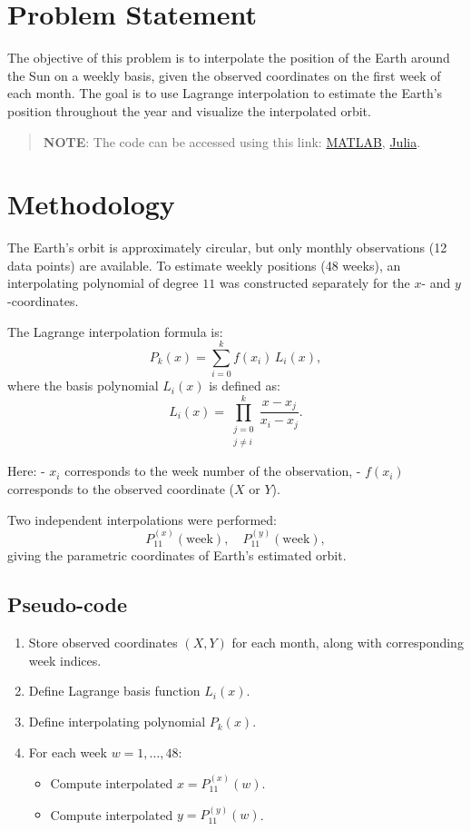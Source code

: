 \section*{Problem Statement}
The objective of this problem is to interpolate the position of the Earth around the Sun on a weekly basis, given the observed coordinates on the first week of each month. The goal is to use Lagrange interpolation to estimate the Earth’s position throughout the year and visualize the interpolated orbit.

\begin{quote}
  \textbf{NOTE}: The code can be accessed using this link: \href{https://raw.githubusercontent.com/HavokSahil/computational-techniques-assignments/refs/heads/main/assignment3/a2.m}{MATLAB}, \href{https://raw.githubusercontent.com/HavokSahil/computational-techniques-assignments/refs/heads/main/assignment3/a2.jl}{Julia}.
\end{quote}

\section*{Methodology}
The Earth’s orbit is approximately circular, but only monthly observations (12 data points) are available. To estimate weekly positions (48 weeks), an interpolating polynomial of degree $11$ was constructed separately for the $x$- and $y$-coordinates.

The Lagrange interpolation formula is:
\[
  P_k(x) = \sum_{i=0}^{k} f(x_i) \, L_i(x),
\]
where the basis polynomial $L_i(x)$ is defined as:
\[
  L_i(x) = \prod_{\substack{j=0 \\ j \neq i}}^{k} \frac{x - x_j}{x_i - x_j}.
\]

Here:
- $x_i$ corresponds to the week number of the observation,
- $f(x_i)$ corresponds to the observed coordinate ($X$ or $Y$).

Two independent interpolations were performed:
\[
P^{(x)}_{11}(\text{week}), \quad P^{(y)}_{11}(\text{week}),
\]
giving the parametric coordinates of Earth’s estimated orbit.

\subsection*{Pseudo-code}
\begin{enumerate}
  \item Store observed coordinates $(X, Y)$ for each month, along with corresponding week indices.
  \item Define Lagrange basis function $L_i(x)$.
  \item Define interpolating polynomial $P_k(x)$.
  \item For each week $w = 1, \dots, 48$:
    \begin{itemize}
      \item Compute interpolated $x = P^{(x)}_{11}(w)$.
      \item Compute interpolated $y = P^{(y)}_{11}(w)$.
    \end{itemize}
\end{enumerate}

